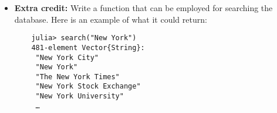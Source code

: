 \begin{exercise}
\begin{itemize}
\begin{verbatim}
    # Convert data to matrices
    nodes = Matrix(nodes)
    edges = Matrix(edges)
            \end{verbatim}

            After you have assigned a rank to all the pages,
            print the 10 pages with the highest ranks.
            My code returns the following entries:
            \begin{multicols}{3}
                \begin{enumerate}
                    \item United States
                    \item United Kingdom
                    \item World War~II
                    \item Latin
                    \item France
                    \item Germany
                    \item English language
                    \item China
                    \item Canada
                    \item India
                \end{enumerate}
            \end{multicols}
        \item
            \textbf{Extra credit:}
            Write a function  that can be employed for searching the database.
            Here is an example of what it could return:

    \begin{verbatim}
    julia> search("New York")
    481-element Vector{String}:
     "New York City"
     "New York"
     "The New York Times"
     "New York Stock Exchange"
     "New York University"
     …
    \end{verbatim}
    \end{itemize}
\end{exercise}


